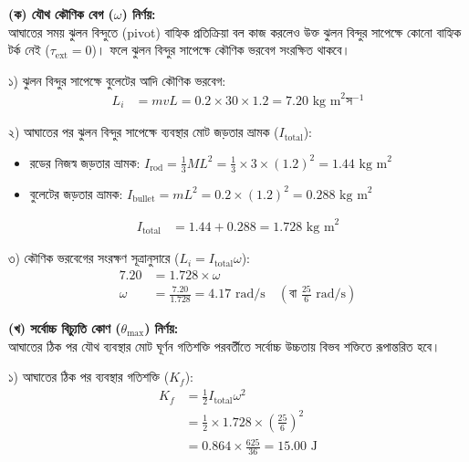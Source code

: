 \documentclass[12pt, a4paper]{article}
\begin{document}
\begin{tcolorbox}[solutionbox={সমাধান (Solution)}]
\noindent
\textbf{(ক) যৌথ কৌণিক বেগ ($\omega$) নির্ণয়:} \\
আঘাতের সময় ঝুলন বিন্দুতে (pivot) বাহ্যিক প্রতিক্রিয়া বল কাজ করলেও উক্ত ঝুলন বিন্দুর সাপেক্ষে কোনো বাহ্যিক টর্ক নেই ($\tau_{\text{ext}} = 0$)। ফলে ঝুলন বিন্দুর সাপেক্ষে কৌণিক ভরবেগ সংরক্ষিত থাকবে।

১) ঝুলন বিন্দুর সাপেক্ষে বুলেটের আদি কৌণিক ভরবেগ:
\begin{align*}
    L_i &= m v L = 0.2 \times 30 \times 1.2 = \mathbf{7.20}\text{ kg m}^2\text{স}^{-1}
\end{align*}

২) আঘাতের পর ঝুলন বিন্দুর সাপেক্ষে ব্যবস্থার মোট জড়তার ভ্রামক ($I_{\text{total}}$):
\begin{itemize}
    \item রডের নিজস্ব জড়তার ভ্রামক: $I_{\text{rod}} = \frac{1}{3} M L^2 = \frac{1}{3} \times 3 \times (1.2)^2 = 1.44\text{ kg m}^2$
    \item বুলেটের জড়তার ভ্রামক: $I_{\text{bullet}} = m L^2 = 0.2 \times (1.2)^2 = 0.288\text{ kg m}^2$
\end{itemize}
\begin{align*}
    I_{\text{total}} &= 1.44 + 0.288 = \mathbf{1.728}\text{ kg m}^2
\end{align*}

৩) কৌণিক ভরবেগের সংরক্ষণ সূত্রানুসারে ($L_i = I_{\text{total}} \omega$):
\begin{align*}
    7.20 &= 1.728 \times \omega \\
    \omega &= \frac{7.20}{1.728} = \mathbf{4.17}\text{ rad/s} \quad \left(\text{বা } \frac{25}{6}\text{ rad/s}\right)
\end{align*}

\vspace{0.5em}
\noindent\textbf{(খ) সর্বোচ্চ বিচ্যুতি কোণ ($\theta_{\max}$) নির্ণয়:} \\
আঘাতের ঠিক পর যৌথ ব্যবস্থার মোট ঘূর্ণন গতিশক্তি পরবর্তীতে সর্বোচ্চ উচ্চতায় বিভব শক্তিতে রূপান্তরিত হবে।

১) আঘাতের ঠিক পর ব্যবস্থার গতিশক্তি ($K_f$):
\begin{align*}
    K_f &= \frac{1}{2} I_{\text{total}} \omega^2 \\
        &= \frac{1}{2} \times 1.728 \times \left(\frac{25}{6}\right)^2 \\
        &= 0.864 \times \frac{625}{36} = \mathbf{15.00}\text{ J}
\end{align*}


\end{tcolorbox}
\end{document}
